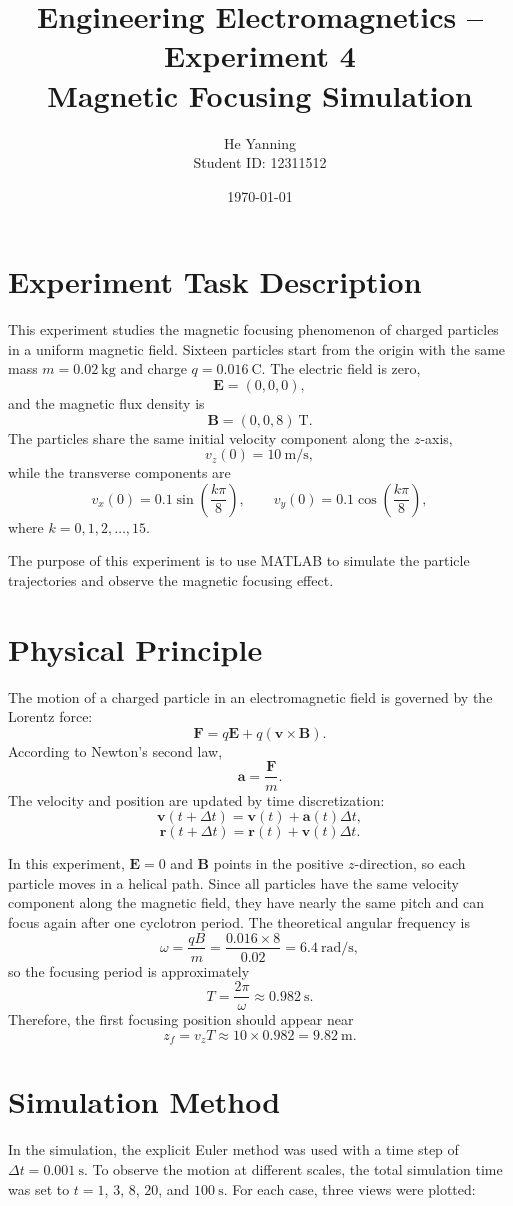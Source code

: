 \documentclass[12pt,a4paper]{article}
\title{\textbf{Engineering Electromagnetics -- Experiment 4}\\Magnetic Focusing Simulation}
\author{He Yanning \\ Student ID: 12311512}
\date{\today}
\begin{document}
\maketitle
\onehalfspacing

\section{Experiment Task Description}
This experiment studies the magnetic focusing phenomenon of charged particles in a uniform magnetic field. Sixteen particles start from the origin with the same mass $m=0.02~\text{kg}$ and charge $q=0.016~\text{C}$. The electric field is zero,
\[
\mathbf{E}=(0,0,0),
\]
and the magnetic flux density is
\[
\mathbf{B}=(0,0,8)\ \text{T}.
\]
The particles share the same initial velocity component along the $z$-axis,
\[
v_z(0)=10~\text{m/s},
\]
while the transverse components are
\[
v_x(0)=0.1\sin\left(\frac{k\pi}{8}\right),\qquad
v_y(0)=0.1\cos\left(\frac{k\pi}{8}\right),
\]
where $k=0,1,2,\dots,15$.

The purpose of this experiment is to use MATLAB to simulate the particle trajectories and observe the magnetic focusing effect.

\section{Physical Principle}
The motion of a charged particle in an electromagnetic field is governed by the Lorentz force:
\[
\mathbf{F}=q\mathbf{E}+q(\mathbf{v}\times\mathbf{B}).
\]
According to Newton's second law,
\[
\mathbf{a}=\frac{\mathbf{F}}{m}.
\]
The velocity and position are updated by time discretization:
\[
\mathbf{v}(t+\Delta t)=\mathbf{v}(t)+\mathbf{a}(t)\Delta t,
\]
\[
\mathbf{r}(t+\Delta t)=\mathbf{r}(t)+\mathbf{v}(t)\Delta t.
\]

In this experiment, $\mathbf{E}=0$ and $\mathbf{B}$ points in the positive $z$-direction, so each particle moves in a helical path. Since all particles have the same velocity component along the magnetic field, they have nearly the same pitch and can focus again after one cyclotron period. The theoretical angular frequency is
\[
\omega=\frac{qB}{m}=\frac{0.016\times 8}{0.02}=6.4~\text{rad/s},
\]
so the focusing period is approximately
\[
T=\frac{2\pi}{\omega}\approx 0.982~\text{s}.
\]
Therefore, the first focusing position should appear near
\[
z_f=v_zT\approx 10\times 0.982=9.82~\text{m}.
\]

\section{Simulation Method}
In the simulation, the explicit Euler method was used with a time step of $\Delta t=0.001~\text{s}$. To observe the motion at different scales, the total simulation time was set to $t=1$, $3$, $8$, $20$, and $100~\text{s}$. For each case, three views were plotted:
\end{document}
